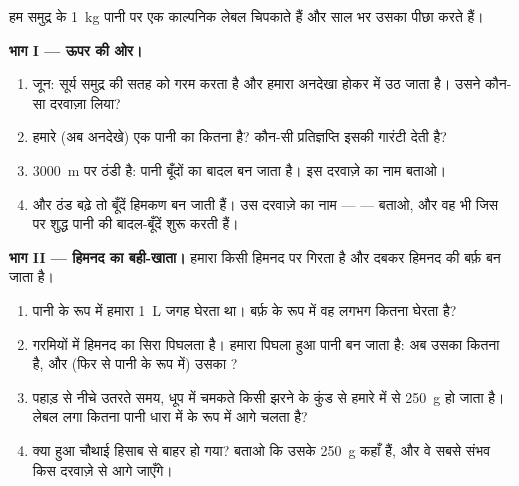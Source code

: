\begin{problem}\label{pb:g6:water-states:1}
हम समुद्र के \qty{1}{kg} पानी पर एक काल्पनिक लेबल चिपकाते हैं और साल
भर उसका पीछा करते हैं।

\medskip\noindent\textbf{भाग I --- ऊपर की ओर।}
\begin{enumerate}
  \item जून: सूर्य समुद्र की सतह को गरम करता है और हमारा 
        अनदेखा होकर  में उठ जाता है। उसने कौन-सा दरवाज़ा लिया?
  \item हमारे (अब अनदेखे) एक  पानी का  कितना है?
        कौन-सी प्रतिज्ञप्ति इसकी गारंटी देती है?
  \item \qty{3000}{m} पर  ठंडी है: पानी बूँदों का बादल बन जाता
        है। इस दरवाज़े का नाम बताओ।
  \item और ठंड बढ़े तो बूँदें हिमकण बन जाती हैं। उस दरवाज़े का नाम
        ---  --- बताओ, और वह  भी जिस पर शुद्ध पानी की
        बादल-बूँदें  शुरू करती हैं।
\end{enumerate}

\medskip\noindent\textbf{भाग II --- हिमनद का बही-खाता।}
हमारा  किसी हिमनद पर गिरता है और दबकर हिमनद की बर्फ़ बन जाता
है।
\begin{enumerate}[resume]
  \item पानी के रूप में हमारा  \qty{1}{L} जगह घेरता था।
        बर्फ़ के रूप में वह लगभग कितना  घेरता है?
  \item गरमियों में हिमनद का सिरा पिघलता है। हमारा  पिघला
        हुआ पानी बन जाता है: अब उसका  कितना है, और (फिर से
         पानी के रूप में) उसका ?
  \item पहाड़ से नीचे उतरते समय, धूप में चमकते किसी झरने के कुंड से
        हमारे  में से \qty{250}{g}  हो जाता है।
        लेबल लगा कितना पानी धारा में  के रूप में आगे चलता है?
  \item क्या  हुआ चौथाई हिसाब से बाहर हो गया? बताओ कि उसके
        \qty{250}{g} कहाँ हैं, और वे सबसे संभव किस दरवाज़े से आगे
        जाएँगे।
\end{enumerate}


\end{problem}
